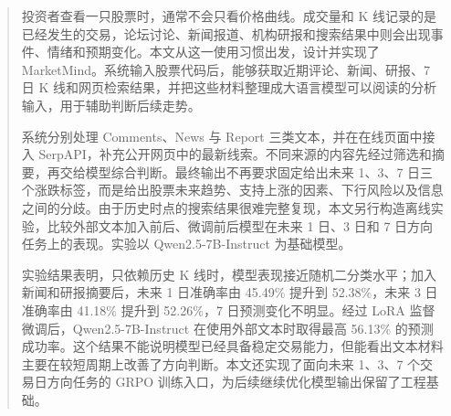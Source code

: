 

\begin{abstract}
投资者查看一只股票时，通常不会只看价格曲线。成交量和 K 线记录的是已经发生的交易，论坛讨论、新闻报道、机构研报和搜索结果中则会出现事件、情绪和预期变化。本文从这一使用习惯出发，设计并实现了 MarketMind。系统输入股票代码后，能够获取近期评论、新闻、研报、7 日 K 线和网页检索结果，并把这些材料整理成大语言模型可以阅读的分析输入，用于辅助判断后续走势。

系统分别处理 Comments、News 与 Report 三类文本，并在在线页面中接入 SerpAPI，补充公开网页中的最新线索。不同来源的内容先经过筛选和摘要，再交给模型综合判断。最终输出不再要求固定给出未来 1、3、7 日三个涨跌标签，而是给出股票未来趋势、支持上涨的因素、下行风险以及信息之间的分歧。由于历史时点的搜索结果很难完整复现，本文另行构造离线实验，比较外部文本加入前后、微调前后模型在未来 1 日、3 日和 7 日方向任务上的表现。实验以 Qwen2.5-7B-Instruct 为基础模型。

实验结果表明，只依赖历史 K 线时，模型表现接近随机二分类水平；加入新闻和研报摘要后，未来 1 日准确率由 45.49\% 提升到 52.38\%，未来 3 日准确率由 41.18\% 提升到 52.26\%，7 日预测变化不明显。经过 LoRA 监督微调后，Qwen2.5-7B-Instruct 在使用外部文本时取得最高 56.13\% 的预测成功率。这个结果不能说明模型已经具备稳定交易能力，但能看出文本材料主要在较短周期上改善了方向判断。本文还实现了面向未来 1、3、7 个交易日方向任务的 GRPO 训练入口，为后续继续优化模型输出保留了工程基础。
\end{abstract}

